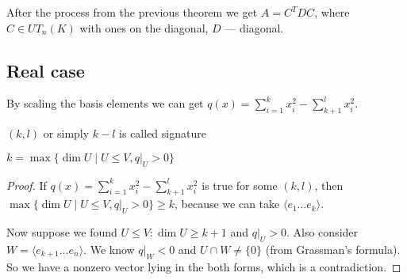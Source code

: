\begin{thr}
    After the process from the previous theorem we get $A = C^T D C$,
    where $C \in UT_n(K)$ with ones on the diagonal, $D$ --- diagonal.
\end{thr}

\subsection*{Real case}
By scaling the basis elements we can get $q(x) = \sum_{i=1}^k x_i^2 - \sum_{k+1}^l x_i^2$. 
\begin{df} $(k, l)$ or simply $k - l$ is called signature \end{df}
\begin{thr}
    $k = \max \{ \dim U \mid U \le V, q|_U > 0 \} $
\end{thr}
\begin{proof}
    If $q(x) = \sum_{i=1}^k x_i^2 - \sum_{k+1}^l x_i^2$ is true for some $(k, l)$, then 
    $\max \{ \dim U \mid U \le V, q|_U > 0 \} \ge k$, 
    because we can take $\langle e_1 \dots e_k \rangle$.

    Now suppose we found $U \le V: \dim U \ge k + 1$ and $q|_U > 0$. Also 
    consider $W = \langle e_{k+1} \dots e_n \rangle$. We know $q|_W < 0$ and 
    $U \cap W \ne \{ 0 \}$ (from Grassman's formula). So we have a nonzero vector lying
    in the both forms, which is a contradiction.
\end{proof}
